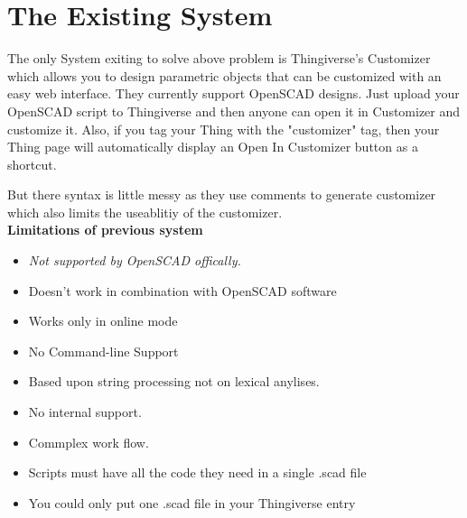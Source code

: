 \section{The Existing System}
The only System exiting to solve above problem is Thingiverse's Customizer which allows you to design parametric objects that can be customized with an easy web interface. They currently support OpenSCAD designs. Just upload your OpenSCAD script to Thingiverse and then anyone can open it in Customizer and customize it. Also, if you tag your Thing with the "customizer" tag, then your Thing page will automatically display an Open In Customizer button as a shortcut. 

But there syntax is little messy as they use comments to generate customizer which also limits the useablitiy of the customizer. \\

{\bf {Limitations of previous system }}
\begin{itemize}
\item \emph{Not supported by OpenSCAD offically.}

\item Doesn't work in combination with OpenSCAD software

\item Works only in online mode

\item No Command-line Support 

\item Based upon string processing not on lexical anylises. 

\item No internal support.

\item Commplex work flow.

\item Scripts must have all the code they need in a single .scad file

\item You could only put one .scad file in your Thingiverse entry
\end{itemize}
